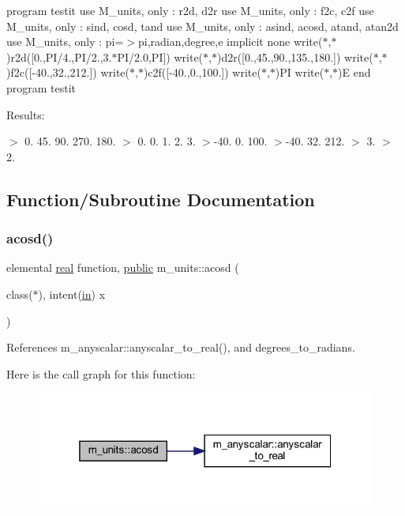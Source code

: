 program testit use M\+\_\+units, only \+: r2d, d2r use M\+\_\+units, only \+: f2c, c2f use M\+\_\+units, only \+: sind, cosd, tand use M\+\_\+units, only \+: asind, acosd, atand, atan2d use M\+\_\+units, only \+: pi=$>$pi,radian,degree,e implicit none write($\ast$,$\ast$)r2d(\mbox{[}0.,P\+I/4.,P\+I/2.,3.$\ast$\+P\+I/2.0,PI\mbox{]}) write($\ast$,$\ast$)d2r(\mbox{[}0.,45.,90.,135.,180.\mbox{]}) write($\ast$,$\ast$)f2c(\mbox{[}-\/40.,32.,212.\mbox{]}) write($\ast$,$\ast$)c2f(\mbox{[}-\/40.,0.,100.\mbox{]}) write($\ast$,$\ast$)PI write($\ast$,$\ast$)E end program testit

Results\+:

$>$ 0. 45. 90. 270. 180. $>$ 0. 0. 1. 2. 3. $>$-\/40. 0. 100. $>$-\/40. 32. 212. $>$ 3. $>$ 2. 

\subsection{Function/\+Subroutine Documentation}
\mbox{\label{namespacem__units_af4446b30251a8832b90b9c6c596104d6}} 
\subsubsection{\texorpdfstring{acosd()}{acosd()}}
{\footnotesize\ttfamily elemental \hyperlink{read__watch_83_8txt_abdb62bde002f38ef75f810d3a905a823}{real} function, \hyperlink{M__stopwatch_83_8txt_a2f74811300c361e53b430611a7d1769f}{public} m\+\_\+units\+::acosd (\begin{DoxyParamCaption}\item[{class($\ast$), intent(\hyperlink{M__journal_83_8txt_afce72651d1eed785a2132bee863b2f38}{in})}]{x }\end{DoxyParamCaption})}



References m\+\_\+anyscalar\+::anyscalar\+\_\+to\+\_\+real(), and degrees\+\_\+to\+\_\+radians.

Here is the call graph for this function\+:
\nopagebreak
\begin{figure}[H]
\begin{center}
\leavevmode
\includegraphics[width=319pt]{namespacem__units_af4446b30251a8832b90b9c6c596104d6_cgraph}
\end{center}
\end{figure}
\mbox{\label{namespacem__units_ad2b3de1ae68e3090d6c5793fc50dce77}} 
